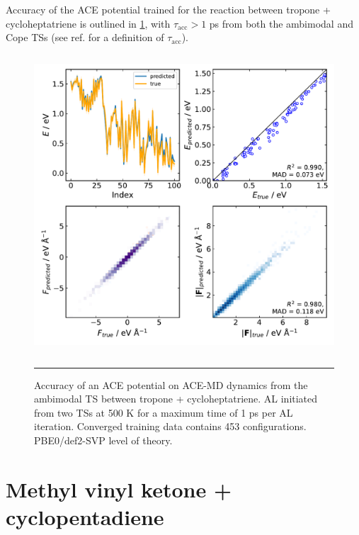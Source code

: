 \documentclass[11pt]{article}
\numberwithin{equation}{subsection}
\newcommand{\tacc}{$\tau_\text{acc}$}
\begin{document}
Accuracy of the ACE potential trained for the reaction between tropone + cycloheptatriene is outlined in \figurename{ \ref{fig::SX33}}, with \tacc $>1$ ps from both the ambimodal and Cope TSs (see ref. \cite{Young2021gap} for a definition of \tacc).

\begin{figure}[h!]
	\centering
	\vspace{0.4cm}
	\includegraphics[height=11.2cm]{figSX33.pdf}
	\vspace{0.1cm}
	\hrule
	\vspace{0.1cm}
	\caption{Accuracy of an ACE potential on ACE-MD dynamics from the ambimodal TS between tropone + cycloheptatriene. AL initiated from two TSs at 500 K for a maximum time of 1 ps per AL iteration. Converged training data contains 453 configurations. PBE0/def2-SVP level of theory.}
	\label{fig::SX33}
\end{figure}



\clearpage 
\section{Methyl vinyl ketone + cyclopentadiene} \label{section::SI_umbrella_R2}
\end{document}

